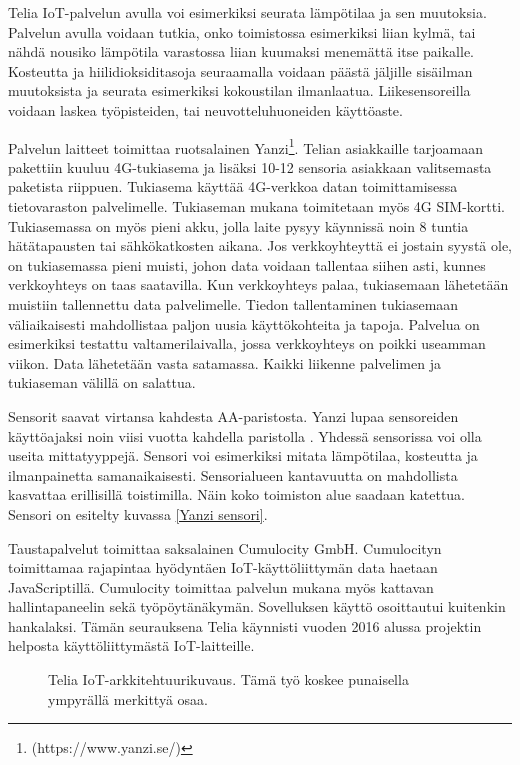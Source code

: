 \documentclass{tktltiki}
\begin{document}
Telia IoT-palvelun avulla voi esimerkiksi seurata lämpötilaa ja sen muutoksia. Palvelun avulla voidaan tutkia, onko toimistossa esimerkiksi liian kylmä, tai nähdä nousiko lämpötila varastossa liian kuumaksi menemättä itse paikalle. Kosteutta ja hiilidioksiditasoja seuraamalla voidaan päästä jäljille sisäilman muutoksista ja seurata esimerkiksi kokoustilan ilmanlaatua. Liikesensoreilla voidaan laskea työpisteiden, tai neuvotteluhuoneiden käyttöaste. 

Palvelun laitteet toimittaa ruotsalainen Yanzi\footnote[1]{(https://www.yanzi.se/)}. Telian asiakkaille tarjoamaan pakettiin kuuluu 4G-tukiasema ja lisäksi 10-12 sensoria asiakkaan valitsemasta paketista riippuen. Tukiasema käyttää 4G-verkkoa datan toimittamisessa tietovaraston palvelimelle. Tukiaseman mukana toimitetaan myös 4G SIM-kortti. Tukiasemassa on myös pieni akku, jolla laite pysyy käynnissä noin 8 tuntia hätätapausten tai sähkökatkosten aikana. Jos verkkoyhteyttä ei jostain syystä ole, on tukiasemassa pieni muisti, johon data voidaan tallentaa siihen asti, kunnes verkkoyhteys on taas saatavilla. Kun verkkoyhteys palaa, tukiasemaan lähetetään muistiin tallennettu data palvelimelle. Tiedon tallentaminen tukiasemaan väliaikaisesti mahdollistaa paljon uusia käyttökohteita ja tapoja. Palvelua on esimerkiksi testattu valtamerilaivalla, jossa verkkoyhteys on poikki useamman viikon. Data lähetetään vasta satamassa. Kaikki liikenne palvelimen ja tukiaseman välillä on salattua.

Sensorit saavat virtansa kahdesta AA-paristosta. Yanzi lupaa sensoreiden käyttöajaksi noin viisi vuotta kahdella paristolla \cite{Yanzi}. Yhdessä sensorissa voi olla useita mittatyyppejä. Sensori voi esimerkiksi mitata lämpötilaa, kosteutta ja ilmanpainetta samanaikaisesti. Sensorialueen kantavuutta on mahdollista kasvattaa erillisillä toistimilla. Näin koko toimiston alue saadaan katettua. Sensori on esitelty kuvassa \ref{Yanzi sensori}.

Taustapalvelut toimittaa saksalainen Cumulocity GmbH. Cumulocityn toimittamaa rajapintaa hyödyntäen IoT-käyttöliittymän data haetaan JavaScriptillä. Cumulocity toimittaa palvelun mukana myös kattavan hallintapaneelin sekä työpöytänäkymän. Sovelluksen käyttö osoittautui kuitenkin hankalaksi. Tämän seurauksena Telia käynnisti vuoden 2016 alussa projektin helposta käyttöliittymästä IoT-laitteille. 

\begin{figure}[h]
\begin{center}
\caption{Telia IoT-arkkitehtuurikuvaus. Tämä työ koskee punaisella ympyrällä merkittyä osaa.}
\label{Arkkitehtuurikuvaus}
\end{center}
\end{figure}
\end{document}
